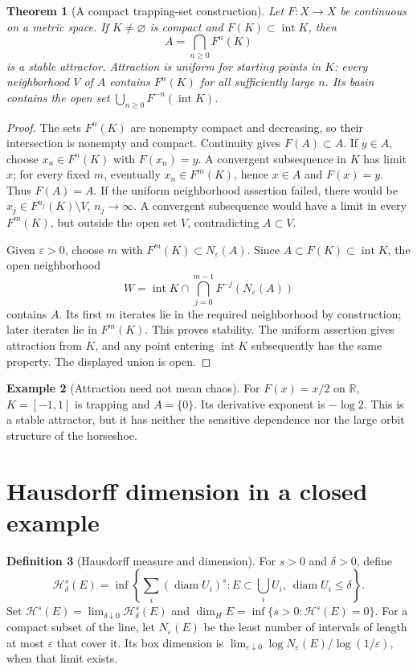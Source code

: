 \documentclass[11pt,oneside]{book}
\newtheorem{theorem}{Theorem}[chapter]
\theoremstyle{definition}
\newtheorem{definition}[theorem]{Definition}
\newtheorem{example}[theorem]{Example}
\theoremstyle{remark}\newtheorem{remark}[theorem]{Remark}
\newcommand{\R}{\mathbb R}\newcommand{\C}{\mathbb C}
\begin{document}
\begin{theorem}[A compact trapping-set construction]\label{d13:18:trapping-attractor}
Let \(F:X\to X\) be continuous on a metric space. If \(K\neq\varnothing\)
is compact and \(F(K)\subset\operatorname{int}K\), then
\[
 A=\bigcap_{n\geq0}F^n(K)
\]
is a stable attractor. Attraction is uniform for starting points in
\(K\): every neighborhood \(V\) of \(A\) contains \(F^n(K)\) for
all sufficiently large \(n\). Its basin contains the open set
\(\bigcup_{n\geq0}F^{-n}(\operatorname{int}K)\).
\end{theorem}
\begin{proof}
The sets \(F^n(K)\) are nonempty compact and decreasing, so their
intersection is nonempty and compact. Continuity gives \(F(A)\subset A\).
If \(y\in A\), choose \(x_n\in F^n(K)\) with \(F(x_n)=y\).
A convergent subsequence in \(K\) has limit \(x\); for every fixed
\(m\), eventually \(x_n\in F^m(K)\), hence \(x\in A\) and \(F(x)=y\).
Thus \(F(A)=A\).
If the uniform neighborhood assertion failed, there would be
\(x_j\in F^{n_j}(K)\setminus V\), \(n_j\to\infty\). A convergent
subsequence would have a limit in every \(F^m(K)\), but outside the
open set \(V\), contradicting \(A\subset V\).

Given \(\varepsilon>0\), choose \(m\) with
\(F^m(K)\subset N_\varepsilon(A)\). Since
\(A\subset F(K)\subset\operatorname{int}K\), the open neighborhood
\[
 W=\operatorname{int}K\cap
       \bigcap_{j=0}^{m-1}F^{-j}(N_\varepsilon(A))
\]
contains \(A\). Its first \(m\) iterates lie in the required
neighborhood by construction; later iterates lie in
\(F^m(K)\). This proves stability. The uniform assertion gives
attraction from \(K\), and any point entering \(\operatorname{int}K\)
subsequently has the same property. The displayed union is open.
\end{proof}

\begin{example}[Attraction need not mean chaos]
For \(F(x)=x/2\) on \(\R\), \(K=[-1,1]\) is trapping and
\(A=\{0\}\). Its derivative exponent is \(-\log2\).
This is a stable attractor, but it has neither the sensitive
dependence nor the large orbit structure of the horseshoe.
\end{example}

\section{Hausdorff dimension in a closed example}

\begin{definition}[Hausdorff measure and dimension]\label{d13:18:hausdorff-definition}
For \(s>0\) and \(\delta>0\), define
\[
 \mathcal H^s_\delta(E)=
 \inf\left\{\sum_i(\operatorname{diam}U_i)^s:
 E\subset\bigcup_iU_i,\ \operatorname{diam}U_i\leq\delta\right\}.
\]
Set \(\mathcal H^s(E)=\lim_{\delta\downarrow0}\mathcal H^s_\delta(E)\)
and
\(\dim_H E=\inf\{s>0:\mathcal H^s(E)=0\}\).
For a compact subset of the line, let \(N_\varepsilon(E)\) be the
least number of intervals of length at most \(\varepsilon\) that
cover it. Its box dimension is
\(\lim_{\varepsilon\downarrow0}\log N_\varepsilon(E)/
 \log(1/\varepsilon)\), when that limit exists.
\end{definition}
\end{document}
